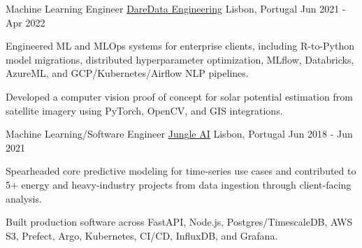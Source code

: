 \begin{cventries}
  \cventry
    {Machine Learning Engineer} %
    {\href{https://www.daredata.ai/}{DareData Engineering}} %
    {Lisbon, Portugal} %
    {Jun 2021 - Apr 2022} %
    {
      \begin{cvitems} %
        \item {Engineered ML and MLOps systems for enterprise clients, including R-to-Python model migrations, distributed hyperparameter optimization, MLflow, Databricks, AzureML, and GCP/Kubernetes/Airflow NLP pipelines.}
        \item {Developed a computer vision proof of concept for solar potential estimation from satellite imagery using PyTorch, OpenCV, and GIS integrations.}
      \end{cvitems}
    }

  \cventry
    {Machine Learning/Software Engineer} %
    {\href{https://www.jungle.ai}{Jungle AI}} %
    {Lisbon, Portugal} %
    {Jun 2018 - Jun 2021} %
    {
      \begin{cvitems} %
        \item {Spearheaded core predictive modeling for time-series use cases and contributed to 5+ energy and heavy-industry projects from data ingestion through client-facing analysis.}
        \item {Built production software across FastAPI, Node.js, Postgres/TimescaleDB, AWS S3, Prefect, Argo, Kubernetes, CI/CD, InfluxDB, and Grafana.}
      \end{cvitems}
    }

\end{cventries}
